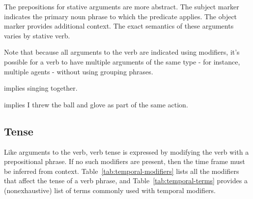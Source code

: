 
The prepositions for stative arguments are more abstract. The subject marker
 indicates the primary noun phrase to which the predicate applies.
The object marker  provides additional context. The exact semantics
of these arguments varies by stative verb.



Note that because all arguments to the verb are indicated using modifiers, it's
possible for a verb to have multiple arguments of the same type - for instance,
multiple agents - without using grouping phrases.


 implies singing together.

 implies I threw the ball
and glove as part of the same action.

\subsection{Tense} \label{sec:tense}

Like arguments to the verb, verb tense is expressed by modifying the verb with a
prepositional phrase. If no such modifiers are present, then the time frame must
be inferred from context. Table~\ref{tab:temporal-modifiers} lists all the
modifiers that affect the tense of a verb phrase, and
Table~\ref{tab:temporal-terms} provides a (nonexhaustive) list of terms commonly
used with temporal modifiers.

